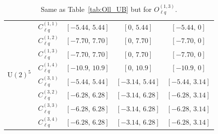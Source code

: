 \begin{table}[tbp]
{\begin{tabular}{ccccc}
    \multirow{8}{*}{$\mathrm{U}(2)^5$}
        & $C_{\ell q}^{(1,1)}$ & $[-5.44,\, 5.44]$ & $[0,\, 5.44]$      & $[-5.44,\, 0]$    \\
        & $C_{\ell q}^{(1,2)}$ & $[-7.70,\, 7.70]$ & $[0,\, 7.70]$      & $[-7.70,\, 0]$    \\
        & $C_{\ell q}^{(1,3)}$ & $[-7.70,\, 7.70]$ & $[0,\, 7.70]$      & $[-7.70,\, 0]$    \\
        & $C_{\ell q}^{(1,4)}$ & $[-10.9,\, 10.9]$ & $[0,\, 10.9]$      & $[-10.9,\, 0]$    \\
        & $C_{\ell q}^{(3,1)}$ & $[-5.44,\, 5.44]$ & $[-3.14,\, 5.44]$  & $[-5.44,\, 3.14]$ \\
        & $C_{\ell q}^{(3,2)}$ & $[-6.28,\, 6.28]$ & $[-3.14,\, 6.28]$  & $[-6.28,\, 3.14]$ \\
        & $C_{\ell q}^{(3,3)}$ & $[-6.28,\, 6.28]$ & $[-3.14,\, 6.28]$  & $[-6.28,\, 3.14]$ \\
        & $C_{\ell q}^{(3,4)}$ & $[-6.28,\, 6.28]$ & $[-3.14,\, 6.28]$  & $[-6.28,\, 3.14]$ \\
    \bottomrule
\end{tabular}}
\caption{Same as Table~\ref{tab:Oll_UB} but for $O_{\ell q}^{(1,3)}$.}
\label{tab:Olq_UB}
\end{table}

